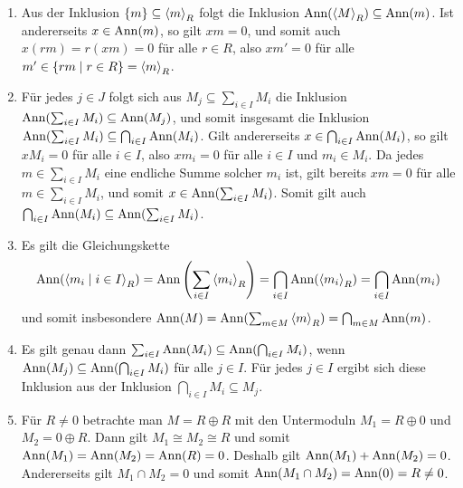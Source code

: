 \begin{solution}
  \begin{enumerate}
    \item
      Aus der Inklusion $\{m\} \subseteq \left\langle m \right\rangle_R$ folgt die Inklusion $\operatorname{Ann}( \left\langle M \right\rangle_R ) \subseteq \operatorname{Ann}(m)$.
      Ist andererseits $x \in \operatorname{Ann}(m)$, so gilt $xm = 0$, und somit auch $x(rm) = r(xm) = 0$ für alle $r \in R$, also $xm' = 0$ für alle $m' \in \{rm \mid r \in R\} = \left\langle m \right\rangle_R$.
    \item
      Für jedes $j \in J$ folgt sich aus $M_j \subseteq \sum_{i \in I} M_i$ die Inklusion $\operatorname{Ann}( \sum_{i \in I} M_i ) \subseteq \operatorname{Ann}(M_j)$, und somit insgesamt die Inklusion $\operatorname{Ann}( \sum_{i \in I} M_i ) \subseteq \bigcap_{i \in I} \operatorname{Ann}(M_i)$.
      Gilt andererseits $x \in \bigcap_{i \in I} \operatorname{Ann}(M_i)$, so gilt $x M_i = 0$ für alle $i \in I$, also $x m_i = 0$ für alle $i \in I$ und $m_i \in M_i$.
      Da jedes $m \in \sum_{i \in I} M_i$ eine endliche Summe solcher $m_i$ ist, gilt bereits $xm = 0$ für alle $m \in \sum_{i \in I} M_i$, und somit $x \in \operatorname{Ann}( \sum_{i \in I} M_i )$.
      Somit gilt auch $\bigcap_{i \in I} \operatorname{Ann}( M_i ) \subseteq \operatorname{Ann}( \sum_{i \in I} M_i )$.
    \item
      Es gilt die Gleichungskette
      \[
          \operatorname{Ann}( \left\langle m_i \mid i \in I \right\rangle_R )
        = \operatorname{Ann}\left( \sum_{i \in I} \left\langle m_i \right\rangle_R \right)
        = \bigcap_{i \in I} \operatorname{Ann}( \left\langle m_i \right\rangle_R )
        = \bigcap_{i \in I} \operatorname{Ann}(m_i)
      \]
      und somit insbesondere $\operatorname{Ann}(M) = \operatorname{Ann}(\sum_{m \in M} \left\langle m \right\rangle_R) = \bigcap_{m \in M} \operatorname{Ann}(m)$.
    \item
      Es gilt genau dann $\sum_{i \in I} \operatorname{Ann}(M_i) \subseteq \operatorname{Ann}( \bigcap_{i \in I} M_i )$, wenn $\operatorname{Ann}(M_j) \subseteq \operatorname{Ann}( \bigcap_{i \in I} M_i )$ für alle $j \in I$.
      Für jedes $j \in I$ ergibt sich diese Inklusion aus der Inklusion $\bigcap_{i \in I} M_i \subseteq M_j$.
    \item
      Für $R \neq 0$ betrachte man $M = R \oplus R$ mit den Untermoduln $M_1 = R \oplus 0$ und $M_2 = 0 \oplus R$.
      Dann gilt $M_1 \cong M_2 \cong R$ und somit $\operatorname{Ann}(M_1) = \operatorname{Ann}(M_2) = \operatorname{Ann}(R) = 0$.
      Deshalb gilt $\operatorname{Ann}(M_1) + \operatorname{Ann}(M_2) = 0$.
      Andererseits gilt $M_1 \cap M_2 = 0$ und somit $\operatorname{Ann}(M_1 \cap M_2) = \operatorname{Ann}(0) = R \neq 0$.
  \end{enumerate}
\end{solution}


